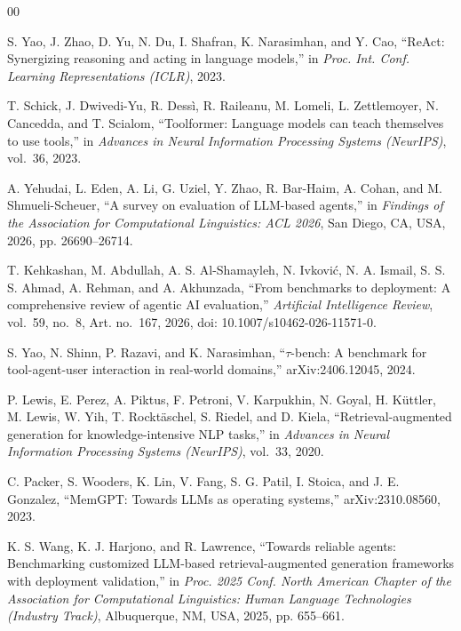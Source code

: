 \documentclass[conference]{IEEEtran}
\begin{document}
\begin{thebibliography}{00}

S. Yao, J. Zhao, D. Yu, N. Du, I. Shafran, K. Narasimhan, and Y. Cao, ``ReAct: Synergizing reasoning and acting in language models,'' in \emph{Proc. Int. Conf. Learning Representations (ICLR)}, 2023.

T. Schick, J. Dwivedi-Yu, R. Dess\`{i}, R. Raileanu, M. Lomeli, L. Zettlemoyer, N. Cancedda, and T. Scialom, ``Toolformer: Language models can teach themselves to use tools,'' in \emph{Advances in Neural Information Processing Systems (NeurIPS)}, vol.~36, 2023.

A. Yehudai, L. Eden, A. Li, G. Uziel, Y. Zhao, R. Bar-Haim, A. Cohan, and M. Shmueli-Scheuer, ``A survey on evaluation of LLM-based agents,'' in \emph{Findings of the Association for Computational Linguistics: ACL 2026}, San Diego, CA, USA, 2026, pp. 26690--26714.

T. Kehkashan, M. Abdullah, A. S. Al-Shamayleh, N. Ivkovi\'{c}, N. A. Ismail, S. S. S. Ahmad, A. Rehman, and A. Akhunzada, ``From benchmarks to deployment: A comprehensive review of agentic AI evaluation,'' \emph{Artificial Intelligence Review}, vol.~59, no.~8, Art. no.~167, 2026, doi: 10.1007/s10462-026-11571-0.

S. Yao, N. Shinn, P. Razavi, and K. Narasimhan, ``$\tau$-bench: A benchmark for tool-agent-user interaction in real-world domains,'' arXiv:2406.12045, 2024.

P. Lewis, E. Perez, A. Piktus, F. Petroni, V. Karpukhin, N. Goyal, H. K\"{u}ttler, M. Lewis, W. Yih, T. Rockt\"{a}schel, S. Riedel, and D. Kiela, ``Retrieval-augmented generation for knowledge-intensive NLP tasks,'' in \emph{Advances in Neural Information Processing Systems (NeurIPS)}, vol.~33, 2020.

C. Packer, S. Wooders, K. Lin, V. Fang, S. G. Patil, I. Stoica, and J. E. Gonzalez, ``MemGPT: Towards LLMs as operating systems,'' arXiv:2310.08560, 2023.

K. S. Wang, K. J. Harjono, and R. Lawrence, ``Towards reliable agents: Benchmarking customized LLM-based retrieval-augmented generation frameworks with deployment validation,'' in \emph{Proc. 2025 Conf. North American Chapter of the Association for Computational Linguistics: Human Language Technologies (Industry Track)}, Albuquerque, NM, USA, 2025, pp. 655--661.


\end{thebibliography}
\end{document}
